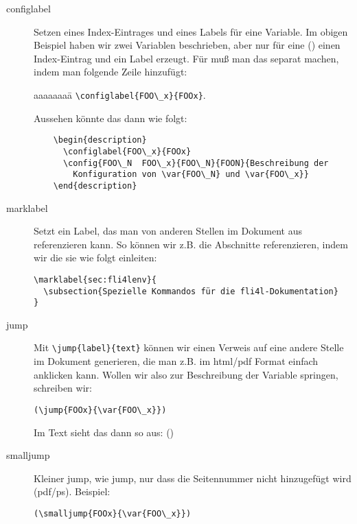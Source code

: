 \begin{description}
\item [configlabel] Setzen eines Index-Eintrages und eines Labels für
  eine Variable. Im obigen Beispiel haben wir zwei Variablen
  beschrieben, aber nur für eine () einen Index-Eintrag und ein
  Label erzeugt. Für  muß man das separat machen, indem man
  folgende Zeile hinzufügt:

  \begin{tabbing}
    aaaaaaaa\=\kill
    \>\verb*?\configlabel{FOO\_x}{FOOx}?.
  \end{tabbing}

  Aussehen könnte das dann wie folgt:

\begin{verbatim}
    \begin{description}
      \configlabel{FOO\_x}{FOOx}
      \config{FOO\_N  FOO\_x}{FOO\_N}{FOON}{Beschreibung der
        Konfiguration von \var{FOO\_N} und \var{FOO\_x}}
    \end{description}
\end{verbatim}

\item [marklabel] Setzt ein Label, das man von anderen Stellen im
  Dokument aus referenzieren kann. So können wir z.B. die
  Abschnitte referenzieren, indem wir die sie wie folgt
  einleiten:
\begin{verbatim}
\marklabel{sec:fli4lenv}{
  \subsection{Spezielle Kommandos für die fli4l-Dokumentation}
}
\end{verbatim}

\item [jump] Mit \verb*?\jump{label}{text}? können wir einen Verweis auf
eine andere Stelle im Dokument generieren, die man z.B. im html/pdf
Format einfach anklicken kann. Wollen wir also zur Beschreibung der
Variable  springen, schreiben wir:
\begin{verbatim}
(\jump{FOOx}{\var{FOO\_x}})
\end{verbatim}

Im Text sieht das dann so aus: ()

\item [smalljump] \glqq{}Kleiner jump\grqq{}, wie jump, nur dass die
Seitennummer nicht hinzugefügt wird (pdf/ps). Beispiel:
\begin{verbatim}
(\smalljump{FOOx}{\var{FOO\_x}})
\end{verbatim}


\end{description}
